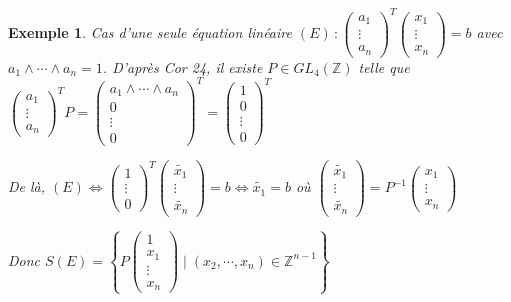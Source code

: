 \documentclass[10pt, a4paper, parskip=full, twoside, twocolumn]{report}
\newtheorem{example}[definition]{Exemple}
\newcommand{\IZ}{\mathbb{Z}}
\begin{document}
\begin{example}
	Cas d'une seule équation linéaire $(E)\,\colon \begin{pmatrix}
		a_1 \\ \vdots \\ a_n
	\end{pmatrix}^T\begin{pmatrix}
		x_1 \\ \vdots \\ x_n
	\end{pmatrix} = b$
	avec $a_1\wedge \cdots \wedge a_n = 1$.
	D'après Cor 24, il existe $P\in GL_4(\IZ)$ telle 
	que 
	$\begin{pmatrix}
		a_1 \\ \vdots \\ a_n
	\end{pmatrix}^TP = \begin{pmatrix}
		a_1\wedge \cdots \wedge a_n \\ 0 \\ \vdots \\ 0
	\end{pmatrix}^T = \begin{pmatrix}
		1 \\ 0 \\ \vdots \\ 0
	\end{pmatrix}^T$

	De là, $(E)\iff \begin{pmatrix}
		1 \\ \vdots \\ 0
	\end{pmatrix}^T\begin{pmatrix}
		\tilde{x_1} \\ \vdots \\ \tilde{x_n}
	\end{pmatrix} = b \iff \tilde{x_1} = b$ où 
	$\left(\begin{smallmatrix}
		\widetilde{x_1} \\ \vdots \\ \widetilde{x_n}
	\end{smallmatrix}\right) = P^{-1}\left(\begin{smallmatrix}
		x_1 \\ \vdots \\ x_n
	\end{smallmatrix}\right)$

	Donc $S(E) = \left\{P\left(\begin{smallmatrix}
		1 \\ x_1 \\ \vdots \\ x_n
	\end{smallmatrix}\right) \mid (x_2,\cdots,x_n)\in \IZ^{n-1}\right\}$
\end{example}
\end{document}
